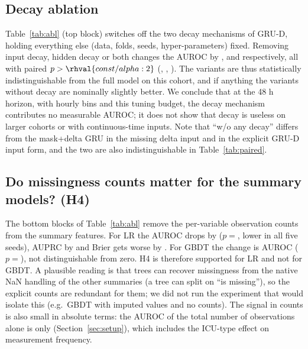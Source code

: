 \subsection{Decay ablation}
Table~\ref{tab:abl} (top block) switches off the two decay mechanisms of GRU-D, holding everything else (data, folds, seeds, hyper-parameters) fixed. Removing input decay, hidden decay or both changes the AUROC by ,  and  respectively, all with paired $p>\rhval{const/alpha:2}$ (, , ). The variants are thus statistically indistinguishable from the full model on this cohort, and if anything the variants without decay are nominally slightly better. We conclude that at the 48 h horizon, with hourly bins and this tuning budget, the decay mechanism contributes no measurable AUROC; it does not show that decay is useless on larger cohorts or with continuous-time inputs. Note that ``w/o any decay'' differs from the mask+delta GRU in the missing delta input and in the explicit GRU-D input form, and the two are also indistinguishable in Table~\ref{tab:paired}.

\subsection{Do missingness counts matter for the summary models? (H4)}
The bottom blocks of Table~\ref{tab:abl} remove the per-variable observation counts from the summary features. For LR the AUROC drops by  ($p=$, lower in all five seeds), AUPRC by  and Brier gets worse by . For GBDT the change is  AUROC ($p=$), not distinguishable from zero. H4 is therefore supported for LR and not for GBDT. A plausible reading is that trees can recover missingness from the native NaN handling of the other summaries (a tree can split on ``is missing''), so the explicit counts are redundant for them; we did not run the experiment that would isolate this (e.g.\ GBDT with imputed values and no counts). The signal in counts is also small in absolute terms: the AUROC of the total number of observations alone is only  (Section~\ref{sec:setup}), which includes the ICU-type effect on measurement frequency.

